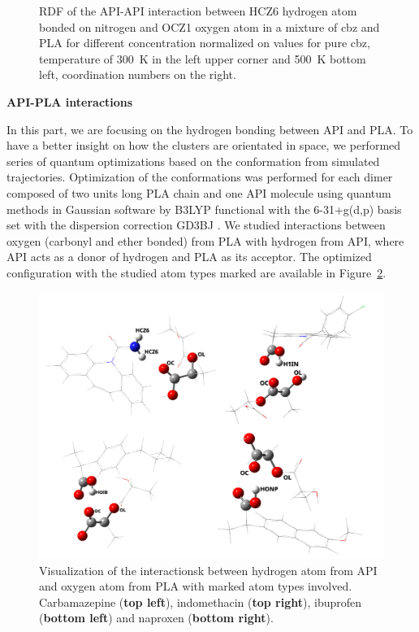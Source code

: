 \begin{figure}[htb]
	\vspace{-0.3cm}
	\caption{RDF of the API-API interaction between HCZ6 hydrogen atom bonded on nitrogen and OCZ1 oxygen atom in a mixture of cbz and PLA for different concentration normalized on values for pure cbz, temperature of 300~K in the left upper corner and 500~K bottom left, coordination numbers on the right.}
	\label{fig:cbz_RDF_}
\end{figure}

\newpage
\textbf{API-PLA interactions}

In this part, we are focusing on the hydrogen bonding between API and PLA. To have a better insight on how the clusters are orientated in space, we performed series of quantum optimizations based on the conformation from simulated trajectories. Optimization of the conformations was performed for each dimer composed of two units long PLA chain and one API molecule using quantum methods in Gaussian\cite{frisch_gaussian16_2016} software by B3LYP functional with the 6-31+g(d,p) basis set with the dispersion correction GD3BJ \cite{smith_revised_2016}. We studied interactions between oxygen (carbonyl and ether bonded) from PLA with hydrogen from API, where API acts as a donor of hydrogen and PLA as its acceptor. The optimized configuration with the studied atom types marked are available in Figure~\ref{fig:contact}.


\begin{figure}[htb!]
	\includegraphics[width=\linewidth]{img/all_pla_api_bp.png} 
	\vspace{-1cm}
	\caption{Visualization of the interactionsk between hydrogen atom from API and oxygen atom from PLA with marked atom types involved. Carbamazepine (\textbf{top left}), indomethacin (\textbf{top right}), ibuprofen (\textbf{bottom left}) and naproxen (\textbf{bottom right}).}
	\vspace{-0.3cm}
	\label{fig:contact}    
\end{figure}

